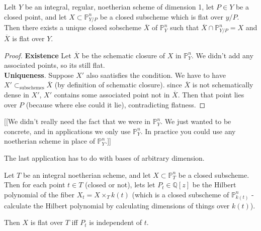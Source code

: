 \begin{proposition}

Lelt $Y$ be an integral, regular, noetherian scheme of dimension
1, let $P \in Y$ be a closed point, and let $X \subset
\mathbb{P}^n_{Y/P}$ be a closed subscheme which is flat over
$y/P$. Then there exists a unique closed sobscheme $\overline{X}$
of $\mathbb{P}^n_{Y}$ such that $\overline{X} \cap
\mathbb{P}^n_{Y/P} = X$ and $\overline{X}$ is flat over $Y$.
\end{proposition}

\begin{proof} \textbf{Existence} Let $\overline{X}$ be the
schematic closure of $X$ in $\mathbb{P}^n_{Y}$. We didn't add any
associated points, so
its still flat.\\

\textbf{Uniqueness}. Suppose $X'$ also saatisfies the condition.
We have to have $X' \subset_{\text{subschemes}}\overline{X}$ (by
definition of schematic closure). since $\overline{X}$ is not
schematically dense in $X'$, $X'$ contains some associated point
not in $\overline{X}$. Then that point lies over $P$ (because
where else could it lie), contradicting flatness. \end{proof}

[[We didn't really need the fact that we were in
$\mathbb{P}^n_{Y}$. We just wanted to be concrete, and in
applications we only use $\mathbb{P}^n_{Y}$. In practice you could
use any noetherian scheme in place of $\mathbb{P}^n_{Y}$.]]

The last application has to do with bases of arbitrary dimension.

\begin{theorem} Let $T$ be an integral noetherian scheme, and let
$X \subset \mathbb{P}^n_{T}$ be a closed subscheme. Then for each
point $t \in T$ (closed or not), lets let $P_t \in \mathbb{Q}[z]$
be the Hilbert polynomial of the fiber $X_t = X \times_T k(t)$
(which is a closed subscheme of $\mathbb{P}^n_{k(t)}$ - calculate
the Hilbert polynomial by calculating dimensions of things over
$k(t)$).

Then $X$ is flat over $T$ iff $P_t$ is independent of $t$.
\end{theorem}

